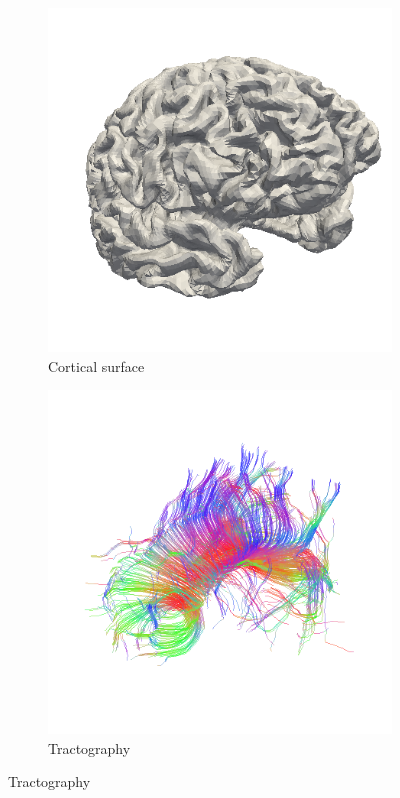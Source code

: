 \documentclass[MSc,paper=a4,pagesize=auto]{icldt}
\begin{document}
\begin{figure}[htbp!]
\centering
\begin{subfigure}{0.3\textwidth}
    \centering
    \includegraphics[width=0.8\linewidth]{resources/content_surface}
    \caption{Cortical surface}
	\label{fig:content_surface}
\end{subfigure}%
\centering
\begin{subfigure}{0.3\textwidth}
    \centering
    \includegraphics[width=0.8\linewidth]{resources/content_tracts}
    \caption{Tractography}
	\label{fig:content_tracts}
\end{subfigure}    

\end{figure}
\end{document}
